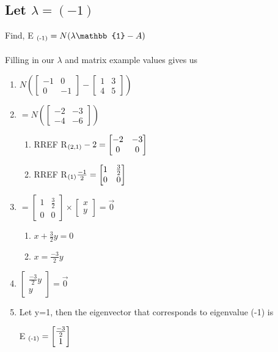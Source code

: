 \documentclass{article}
\begin{document}
\subsection{Let $\lambda = (-1)$}
Find, E $\textsubscript{(-1)} = N( \lambda \mathbb{1} - A)$ 
\\
\\
Filling in our $\lambda$ and matrix example values gives us
\begin{center}
\begin{enumerate}
	\item $ N( \begin{bmatrix}    -1  & 0 \\  0  & -1       \end{bmatrix} - \begin{bmatrix} 1  & 3    \\  4  & 5      \end{bmatrix} )$
	\item $ = N( \begin{bmatrix}    -2 & -3 \\  -4 & -6       \end{bmatrix} )$
	\begin{enumerate}
		\item RREF R$\textsubscript{(2,1)}-2 = \begin{bmatrix}    -2 & -3 \\  0 & 0       \end{bmatrix}$
		\item RREF R$\textsubscript{(1)}\frac{-1}{2} = \begin{bmatrix}    1 & \frac{3}{2} \\  0 & 0       \end{bmatrix}$
	\end{enumerate}
	\item $ = \begin{bmatrix}    1 & \frac{3}{2} \\  0 & 0       \end{bmatrix} 
		\times  \begin{bmatrix}   x  \\  y    \end{bmatrix} = \vec{0} $
	\begin{enumerate}
		\item $ x + \frac{ 3}{2} y = 0 $
		\item $ x = \frac{-3}{2} y $
	\end{enumerate}
	\item $\begin{bmatrix}   \frac{-3}{2}  y  \\  y    \end{bmatrix} = \vec{0} $
	\item Let y=1, then the eigenvector that corresponds to eigenvalue (-1) is
	\\
	\begin{center}
	E $\textsubscript{(-1)} = \begin{bmatrix}   \frac{-3}{2} \\  1    \end{bmatrix}$
	\end{center}
\end{enumerate}
\end{center}
\end{document}
